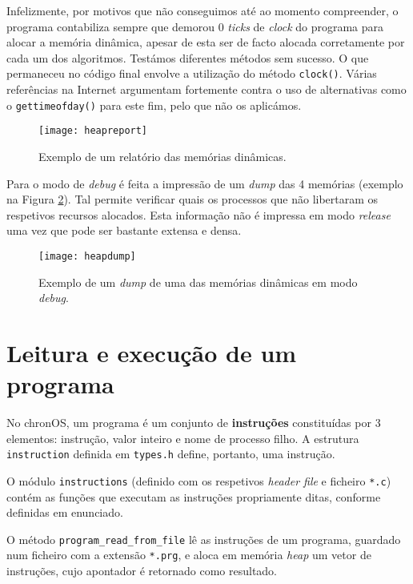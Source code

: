 \documentclass[10pt,oneside]{estiloUBI}
\newcommand{\chronOS}{\textsf{chronOS}}
\begin{document}
	Infelizmente, por motivos que não conseguimos até ao momento compreender, o programa contabiliza sempre que demorou 0 \textit{ticks} de \textit{clock} do programa para alocar a memória dinâmica, apesar de esta ser de facto alocada corretamente por cada um dos algoritmos. Testámos diferentes métodos sem sucesso. O que permaneceu no código final envolve a utilização do método \verb|clock()|. Várias referências na Internet argumentam fortemente contra o uso de alternativas como o \verb|gettimeofday()| para este fim, pelo que não os aplicámos.
	
	\begin{figure}[!htbp]
		\centering
		\texttt{[image: heapreport]}
		\caption{Exemplo de um relatório das memórias dinâmicas.}
		\label{fig:heapreport}
	\end{figure}

	Para o modo de \textit{debug} é feita a impressão de um \textit{dump} das 4 memórias (exemplo na Figura \ref{fig:heapdump}). Tal permite verificar quais os processos que não libertaram os respetivos recursos alocados. Esta informação não é impressa em modo \textit{release} uma vez que pode ser bastante extensa e densa.
	
	\begin{figure}[!htbp]
		\centering
		\texttt{[image: heapdump]}
		\caption{Exemplo de um \textit{dump} de uma das memórias dinâmicas em modo \textit{debug}.}
		\label{fig:heapdump}
	\end{figure}

	
	\chapter{Leitura e execução de um programa}
	\label{sec:program}
	
	No \chronOS, um programa é um conjunto de \textbf{instruções} constituídas por 3 elementos: instrução, valor inteiro e nome de processo filho. A estrutura \verb|instruction| definida em \verb|types.h| define, portanto, uma instrução.
	
	O módulo \texttt{instructions} (definido com os respetivos \textit{header file} e ficheiro \verb|*.c|) contém as funções que executam as instruções propriamente ditas, conforme definidas em enunciado.
	
	O método \verb|program_read_from_file| lê as instruções de um programa, guardado num ficheiro com a extensão \verb|*.prg|, e aloca em memória \textit{heap} um vetor de instruções, cujo apontador é retornado como resultado.
	
\end{document}
